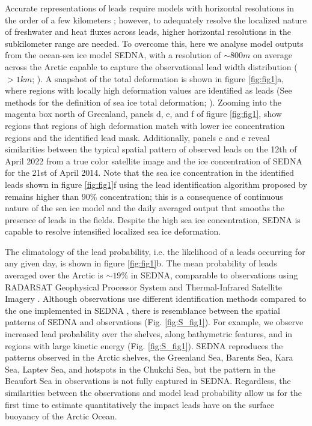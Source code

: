 \documentclass[lineno,sn-basic]{sn-jnl}%
\begin{document}
Accurate representations of leads require models with horizontal resolutions in the order of a few kilometers \citep{Bouchat_sea_ice_rheology_2022, Wang_leads_2016}; however, to adequately resolve the localized nature of freshwater and heat fluxes across leads, higher horizontal resolutions in the subkilometer range are needed. To overcome this, here we analyse model outputs from the ocean-sea ice model SEDNA, with a resolution of $\sim 800m$ on average across the Arctic capable to capture the observational lead width distribution ($>1km$; \citealp{Wernecke_Lead_2015}). 
A snapshot of the total deformation is shown in figure \ref{fig:fig1}a, where regions with locally high deformation values are identified as leads (See methods for the definition of sea ice total deformation; \citealp{Hutter_identification_2019, kwok_deformation_2001,Ruffieux_pack_lead_1995}). Zooming into the magenta box north of Greenland, panels d, e, and f of figure \ref{fig:fig1}, show regions that regions of high deformation match with lower ice concentration regions and the identified lead mask. 
Additionally, panels c and e reveal similarities between the typical spatial pattern of observed leads on the 12th of April 2022 from a true color satellite image and the ice concentration of SEDNA for the 21st of April 2014. Note that the sea ice concentration in the identified leads shown in figure \ref{fig:fig1}f using the lead identification algorithm proposed by \citet{Hutter_identification_2019} remains higher than 90\% concentration; this is a consequence of continuous nature of the sea ice model and the daily averaged output that smooths the presence of leads in the fields. 
Despite the high sea ice concentration, SEDNA is capable to resolve intensified localized sea ice deformation. 

The climatology of the lead probability, i.e. the likelihood of a leads occurring for any given day, is shown in figure \ref{fig:fig1}b. The mean probability of leads averaged over the Arctic is $\sim 19\%$ in SEDNA, comparable to observations using RADARSAT Geophysical Processor System and Thermal-Infrared Satellite Imagery \citep{Wernecke_Lead_2015,Willmes_leads_currents_2023}. Although observations use different identification methods compared to the one implemented in SEDNA \citep{Hutter_identification_2019}, there is resemblance between the spatial patterns of SEDNA and observations (Fig. \ref{fig:S_fig1}). For example, we observe increased lead probability over the shelves, along bathymetric features, and in regions with large kinetic energy (Fig. \ref{fig:S_fig1}). SEDNA reproduces the patterns observed in the Arctic shelves, the Greenland Sea, Barents Sea, Kara Sea, Laptev Sea, and hotspots in the Chukchi Sea, but the pattern in the Beaufort Sea in observations is not fully captured in SEDNA. Regardless, the similarities between the observations and model lead probability allow us for the first time to estimate quantitatively the impact leads have on the surface buoyancy of the Arctic Ocean.
\end{document}
